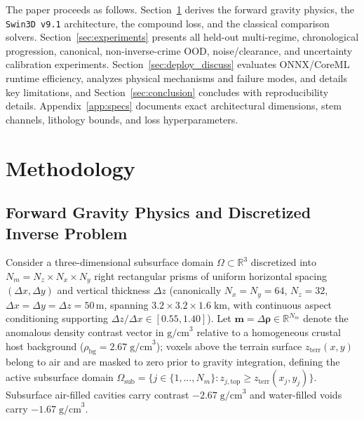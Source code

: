 \documentclass[11pt,a4paper]{article}
\begin{document}
The paper proceeds as follows. Section~\ref{sec:method} derives the forward gravity physics, the \texttt{Swin3D v9.1} architecture, the compound loss, and the classical comparison solvers. Section~\ref{sec:experiments} presents all held-out multi-regime, chronological progression, canonical, non-inverse-crime OOD, noise/clearance, and uncertainty calibration experiments. Section~\ref{sec:deploy_discuss} evaluates ONNX/CoreML runtime efficiency, analyzes physical mechanisms and failure modes, and details key limitations, and Section~\ref{sec:conclusion} concludes with reproducibility details. Appendix~\ref{app:specs} documents exact architectural dimensions, stem channels, lithology bounds, and loss hyperparameters.

\section{Methodology}
\label{sec:method}

\subsection{Forward Gravity Physics and Discretized Inverse Problem}

Consider a three-dimensional subsurface domain $\Omega \subset \mathbb{R}^3$ discretized into $N_m = N_z \times N_x \times N_y$ right rectangular prisms of uniform horizontal spacing $(\Delta x, \Delta y)$ and vertical thickness $\Delta z$ (canonically $N_x = N_y = 64$, $N_z = 32$, $\Delta x = \Delta y = \Delta z = 50$\,m, spanning $3.2 \times 3.2 \times 1.6\;\text{km}$, with continuous aspect conditioning supporting $\Delta z / \Delta x \in [0.55, 1.40]$). Let $\mathbf{m} = \Delta\boldsymbol{\rho} \in \mathbb{R}^{N_m}$ denote the anomalous density contrast vector in $\text{g/cm}^3$ relative to a homogeneous crustal host background ($\rho_{\mathrm{bg}} = 2.67\;\text{g/cm}^3$); voxels above the terrain surface $z_{\mathrm{terr}}(x,y)$ belong to air and are masked to zero prior to gravity integration, defining the active subsurface domain $\Omega_{\mathrm{sub}} = \{j \in \{1,\dots,N_m\} : z_{j,\mathrm{top}} \ge z_{\mathrm{terr}}(x_j, y_j)\}$. Subsurface air-filled cavities carry contrast $-2.67\;\text{g/cm}^3$ and water-filled voids carry $-1.67\;\text{g/cm}^3$.
\end{document}

